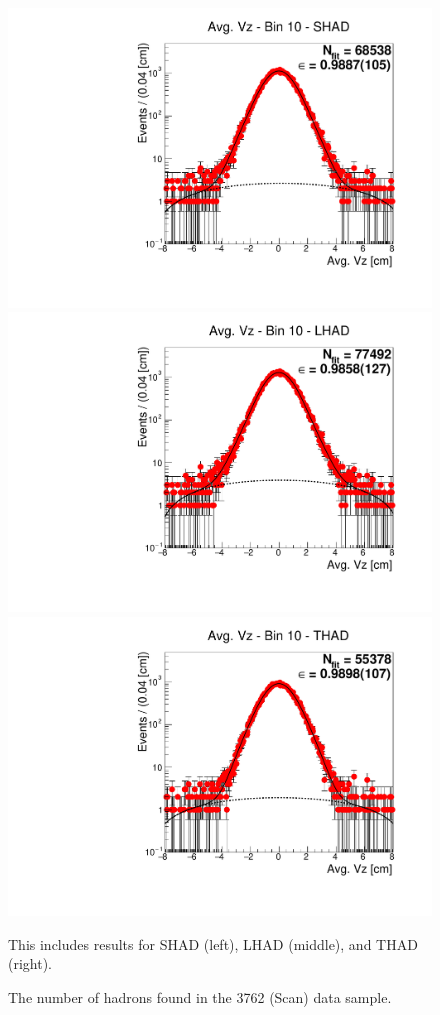 \begin{figure}[H]
\centering
\includegraphics[scale=0.25]{figures/plots/nonDDbar_fit_results/scan/fit_scan_10_data_SHAD.pdf}
\hspace{-0.5cm}
\includegraphics[scale=0.25]{figures/plots/nonDDbar_fit_results/scan/fit_scan_10_data_LHAD.pdf}
\hspace{-0.5cm}
\includegraphics[scale=0.25]{figures/plots/nonDDbar_fit_results/scan/fit_scan_10_data_THAD.pdf}
\caption{The number of hadrons found in the 3762 (Scan) data sample.}
{This includes results for SHAD (left), LHAD (middle), and THAD (right).}
\label{fig:hadron_fits_scan_10}
\end{figure}

